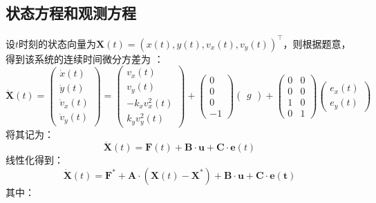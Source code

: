 \documentclass[12pt, onecolumn]{article}
\newcommand\normf{\fangsong}
\begin{document}
	\subsection{\normf 状态方程和观测方程}
	设$t$时刻的状态向量为$\boldsymbol{X}(t)=\left( x(t),y(t),v_x(t),v_y(t)\right) ^\top$，则根据题意，得到该系统的连续时间微分方差为
	：
	\begin{equation}
	\dot{\boldsymbol{X}}(t)=\begin{pmatrix}
	\dot{x}(t)\\\dot{y}(t)\\\dot{v}_x(t)\\\dot{v}_y(t)
	\end{pmatrix}=\begin{pmatrix}
	v_x(t)\\
	v_y(t)\\
	-k_x v^2_x(t)\\
	k_y v^2_y(t)
	\end{pmatrix}+\begin{pmatrix}
	0\\0\\0\\-1
	\end{pmatrix}\begin{pmatrix}
	g
	\end{pmatrix}+\begin{pmatrix}
	0&0\\
	0&0\\
	1&0\\
	0&1
	\end{pmatrix}\begin{pmatrix}
	e_x(t)\\
	e_y(t)
	\end{pmatrix}
	\end{equation}
	将其记为：
	\begin{equation}
	\dot{\boldsymbol{X}}(t)=\boldsymbol{F}(t)+\boldsymbol{B}\cdot\boldsymbol{u}+\boldsymbol{C}\cdot\boldsymbol{e}(t)
	\end{equation}
	线性化得到：
	\begin{equation}
	\dot{\boldsymbol{X}}(t)=\boldsymbol{F^*}+\boldsymbol{A}\cdot\left( \boldsymbol{X}(t)-\boldsymbol{X^*}\right) +\boldsymbol{B}\cdot\boldsymbol{u}+\boldsymbol{C}\cdot\boldsymbol{e(t)}
	\end{equation}
	其中：
\end{document}
